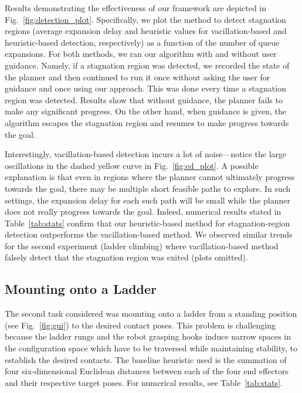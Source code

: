 \documentclass{article}
\begin{document}
Results demonstrating the effectiveness of our framework are depicted in Fig.~\ref{fig:detection_plot}.
Specifically, we plot the 
method to detect stagnation regions (average expansion delay and heuristic values for vacillation-based and heuristic-based detection, respectively) as a function of the number of queue expansions.
For both methods, we ran our algorithm with and without user guidance.
Namely, if a stagnation region was detected, we recorded the state of the planner and then continued to run it once without asking the user for guidance and once using our approach. This was done every time a stagnation region was detected. 
Results show that without guidance, the planner fails to make any significant progress.
On the other hand, when guidance is given, the algorithm escapes the stagnation region and resumes to make progress towards the goal.

Interestingly, vacillation-based detection incurs a lot of noise---notice the large oscillations in the dashed yellow curve in Fig.~\ref{fig:ed_plot}. 
A possible explanation is that even in regions where the planner cannot ultimately progress towards the goal, there may be multiple short feasible paths to explore. In such settings, the expansion delay for each such path will be small while the planner does not really progress towards the goal.
Indeed, numerical results stated in Table~\ref{tab:stats} confirm that our heuristic-based method for stagnation-region detection outperforms the vacillation-based method.
We observed similar trends for the second experiment (ladder climbing) where vacillation-based method falsely detect that the stagnation region was exited (plots omitted).


\subsection{Mounting onto a Ladder}
The second task considered was mounting onto a ladder from a standing position (see Fig.~\ref{fig:gui}) to the desired contact poses. This problem is challenging because the ladder rungs and the robot grasping hooks induce narrow spaces in the configuration space which have to be traversed while maintaining stability, to establish the desired contacts. The baseline heuristic  used is the summation of four six-dimensional Euclidean distances between each of the four end effectors and their respective target poses. 
For numerical results, see Table~\ref{tab:stats}.

\end{document}
